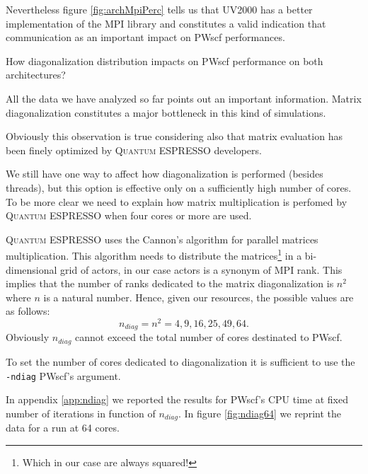 \documentclass[a4paper,12pt]{article}
\newcommand\QE{\textsc{Quantum} ESPRESSO }
\begin{document}
Nevertheless figure \ref{fig:archMpiPerc} tells us that UV2000 has a better implementation of the MPI library and constitutes a valid indication that communication as an important impact on PWscf performances.

\newpage
\begin{center}
\begin{framed}
	How diagonalization distribution impacts on PWscf performance on both architectures?
\end{framed}
\end{center}

All the data we have analyzed so far points out an important information.
Matrix diagonalization constitutes a major bottleneck in this kind of simulations.

Obviously this observation is true considering also that matrix evaluation has been finely optimized by \QE developers.

We still have one way to affect how diagonalization is performed (besides threads), but this option is effective only on a sufficiently high number of cores.
To be more clear we need to explain how matrix multiplication is perfomed by \QE when four cores or more are used.

\QE uses the Cannon's algorithm\cite{Cannon} for parallel matrices multiplication\cite{QE2}. 
This algorithm needs to distribute the matrices\footnote{Which in our case are always squared!} in a bi-dimensional grid of actors, in our case actors is a synonym of MPI rank.
This implies that the number of ranks dedicated to the matrix diagonalization is $n^2$ where $n$ is a natural number.
Hence, given our resources, the possible values are as follows:
\begin{equation*}
	n_{diag} = n^2 = 4 , 9 , 16 , 25 , 49 , 64 .
\end{equation*}
Obviously $n_{diag}$ cannot exceed the total number of cores destinated to PWscf.

To set the number of cores dedicated to diagonalization it is sufficient to use the \texttt{-ndiag} PWscf's argument.

In appendix \ref{app:ndiag} we reported the results for PWscf's CPU time at fixed number of iterations in function of $n_{diag}$. 
In figure \ref{fig:ndiag64} we reprint the data for a run at 64 cores.
\end{document}
